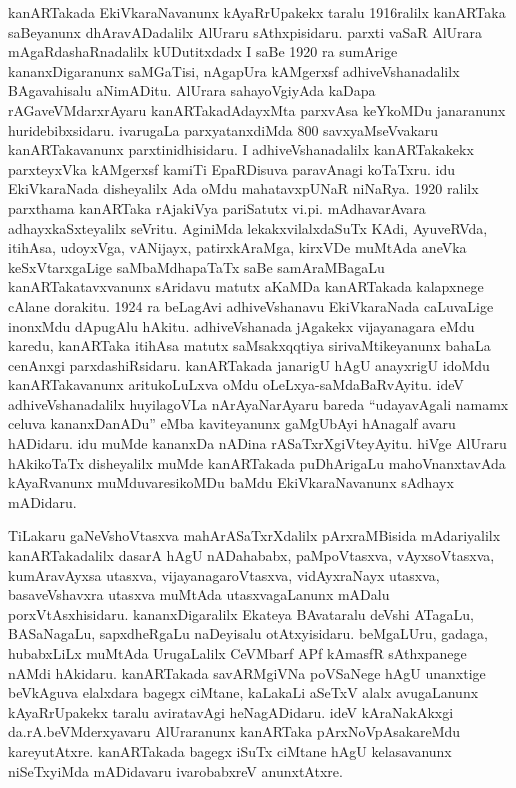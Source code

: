 \documentclass[11pt,a4size]{article}
\begin{document}
kanARTakada EkiVkaraNavanunx kAyaRrUpakekx taralu 1916ralilx kanARTaka
saBeyanunx dhAravADadalilx AlUraru sAthxpisidaru. parxti vaSaR AlUrara
mAgaRdashaRnadalilx kUDutitxdadx I saBe 1920 ra sumArige
kananxDigaranunx saMGaTisi, nAgapUra kAMgerxsf adhiveVshanadalilx
BAgavahisalu aNimADitu. AlUrara sahayoVgiyAda kaDapa
rAGaveVMdarxrAyaru kanARTakadAdayxMta parxvAsa keYkoMDu janaranunx
huridebibxsidaru. ivarugaLa parxyatanxdiMda 800 savxyaMseVvakaru
kanARTakavanunx parxtinidhisidaru. I adhiveVshanadalilx kanARTakakekx
parxteyxVka kAMgerxsf kamiTi EpaRDisuva paravAnagi koTaTxru. idu
EkiVkaraNada disheyalilx Ada oMdu mahatavxpUNaR niNaRya. 1920 ralilx
parxthama kanARTaka rAjakiVya pariSatutx vi.pi. mAdhavarAvara
adhayxkaSxteyalilx seVritu. AginiMda lekakxvilalxdaSuTx KAdi,
AyuveRVda, itihAsa,  udoyxVga, vANijayx, patirxkAraMga, kirxVDe
muMtAda aneVka keSxVtarxgaLige saMbaMdhapaTaTx saBe samAraMBagaLu
kanARTakatavxvanunx sAridavu matutx aKaMDa kanARTakada kalapxnege
cAlane dorakitu. 1924 ra beLagAvi adhiveVshanavu EkiVkaraNada
caLuvaLige inonxMdu dApugAlu hAkitu. adhiveVshanada jAgakekx
vijayanagara eMdu karedu, kanARTaka itihAsa matutx saMsakxqqtiya
sirivaMtikeyanunx bahaLa cenAnxgi parxdashiRsidaru. kanARTakada
janarigU hAgU anayxrigU idoMdu kanARTakavanunx aritukoLuLxva oMdu
oLeLxya-saMdaBaRvAyitu. ideV adhiveVshanadalilx huyilagoVLa
nArAyaNarAyaru bareda ``udayavAgali namamx celuva kananxDanADu'' eMba
kaviteyanunx gaMgUbAyi hAnagalf avaru hADidaru. idu muMde kananxDa
nADina rASaTxrXgiVteyAyitu. hiVge AlUraru hAkikoTaTx disheyalilx muMde
kanARTakada puDhArigaLu mahoVnanxtavAda kAyaRvanunx muMduvaresikoMDu
baMdu EkiVkaraNavanunx sAdhayx mADidaru.

TiLakaru gaNeVshoVtasxva mahArASaTxrXdalilx pArxraMBisida mAdariyalilx
kanARTakadalilx dasarA hAgU nADahababx, paMpoVtasxva, vAyxsoVtasxva,
kumAravAyxsa utasxva, vijayanagaroVtasxva, vidAyxraNayx
 utasxva,
basaveVshavxra
 utasxva muMtAda utasxvagaLanunx mADalu
porxVtAsxhisidaru. kananxDigaralilx Ekateya BAvataralu deVshi ATagaLu,
BASaNagaLu, sapxdheRgaLu naDeyisalu otAtxyisidaru. beMgaLUru, gadaga,
hubabxLiLx muMtAda UrugaLalilx CeVMbarf APf kAmasfR sAthxpanege nAMdi
hAkidaru. kanARTakada savARMgiVNa poVSaNege hAgU unanxtige beVkAguva
elalxdara bagegx ciMtane, kaLakaLi aSeTxV alalx avugaLanunx
kAyaRrUpakekx taralu aviratavAgi heNagADidaru. ideV kAraNakAkxgi
da.rA.beVMderxyavaru AlUraranunx kanARTaka pArxNoVpAsakareMdu
kareyutAtxre. kanARTakada bagegx iSuTx ciMtane hAgU kelasavanunx
niSeTxyiMda mADidavaru ivarobabxreV anunxtAtxre.
\end{document}
